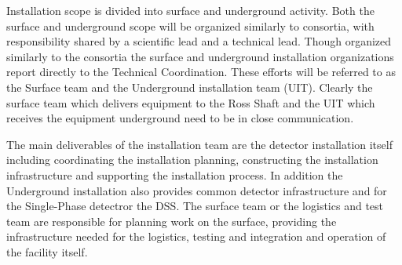 Installation scope is divided into surface and underground
activity. Both the surface and underground scope will be organized
similarly to consortia, with responsibility shared by a scientific
lead and a technical lead. Though organized similarly to the consortia
the surface and underground installation organizations report directly
to the Technical Coordination. These efforts will be referred to as
the Surface team and the Underground installation team (UIT). Clearly
the surface team which delivers equipment to the Ross Shaft and the
UIT which receives the equipment underground need to be in close
communication. 

The main deliverables of the installation team are the
detector installation itself including coordinating the installation
planning, constructing the installation infrastructure and supporting
the installation process. In addition the Underground installation
also provides common detector infrastructure and for the Single-Phase detectror the DSS. The surface
team or the logistics and test team are responsible for planning
 work on the surface, providing the infrastructure needed
for the logistics, testing and integration and operation of the
facility itself. 





